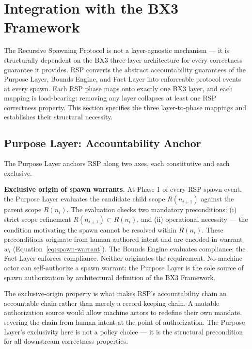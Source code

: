 \section{Integration with the BX3 Framework}
\label{sec:rs-integration}

The Recursive Spawning Protocol is not a layer-agnostic mechanism --- it is structurally dependent on the BX3 three-layer architecture for every correctness guarantee it provides. RSP converts the abstract accountability guarantees of the Purpose Layer, Bounds Engine, and Fact Layer into enforceable protocol events at every spawn. Each RSP phase maps onto exactly one BX3 layer, and each mapping is load-bearing: removing any layer collapses at least one RSP correctness property. This section specifies the three layer-to-phase mappings and establishes their structural necessity.

\subsection{Purpose Layer: Accountability Anchor}
\label{sec:rs-purpose-anchor}

The Purpose Layer anchors RSP along two axes, each constitutive and each exclusive.

\medskip
\noindent\textbf{Exclusive origin of spawn warrants.} At Phase 1 of every RSP spawn event, the Purpose Layer evaluates the candidate child scope $R(n_{i+1})$ against the parent scope $R(n_i)$. The evaluation checks two mandatory preconditions: (i) strict scope refinement $R(n_{i+1}) \subset R(n_i)$, and (ii) operational necessity --- the condition motivating the spawn cannot be resolved within $R(n_i)$. These preconditions originate from human-authored intent and are encoded in warrant $w_i$ (Equation~\ref{eq:spawn-warrant}). The Bounds Engine evaluates compliance; the Fact Layer enforces compliance. Neither originates the requirement. No machine actor can self-authorize a spawn warrant: the Purpose Layer is the sole source of spawn authorization by architectural definition of the BX3 Framework.

The exclusive-origin property is what makes RSP's accountability chain an accountable chain rather than merely a record-keeping chain. A mutable authorization source would allow machine actors to redefine their own mandate, severing the chain from human intent at the point of authorization. The Purpose Layer's exclusivity here is not a policy choice --- it is the structural precondition for all downstream correctness properties.

